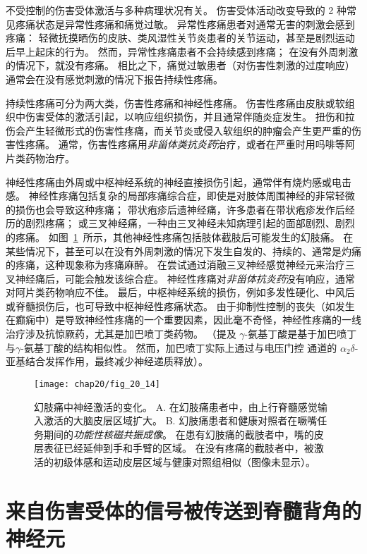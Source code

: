 不受控制的伤害受体激活与多种病理状况有关。
伤害受体活动改变导致的 2 种常见疼痛状态是异常性疼痛和痛觉过敏。
异常性疼痛患者对通常无害的刺激会感到疼痛：
轻微抚摸晒伤的皮肤、类风湿性关节炎患者的关节运动，甚至是剧烈运动后早上起床的行为。
然而，异常性疼痛患者不会持续感到疼痛；
在没有外周刺激的情况下，就没有疼痛。
相比之下，痛觉过敏患者（对伤害性刺激的过度响应）通常会在没有感觉刺激的情况下报告持续性疼痛。


持续性疼痛可分为两大类，伤害性疼痛和神经性疼痛。
伤害性疼痛由皮肤或软组织中伤害受体的激活引起，以响应组织损伤，并且通常伴随炎症发生。
扭伤和拉伤会产生轻微形式的伤害性疼痛，而关节炎或侵入软组织的肿瘤会产生更严重的伤害性疼痛。
通常，伤害性疼痛用\textit{非甾体类抗炎药}治疗，或者在严重时用吗啡等阿片类药物治疗。


神经性疼痛由外周或中枢神经系统的神经直接损伤引起，通常伴有烧灼感或电击感。
神经性疼痛包括复杂的局部疼痛综合症，即使是对肢体周围神经的非常轻微的损伤也会导致这种疼痛；
带状疱疹后遗神经痛，许多患者在带状疱疹发作后经历的剧烈疼痛；
或三叉神经痛，一种由三叉神经未知病理引起的面部剧烈、剧烈的疼痛。
如图~\ref{fig:20_14}~所示，其他神经性疼痛包括肢体截肢后可能发生的幻肢痛。
在某些情况下，甚至可以在没有外周刺激的情况下发生自发的、持续的、通常是灼痛的疼痛，这种现象称为疼痛麻醉。
在尝试通过消融三叉神经感觉神经元来治疗三叉神经痛后，可能会触发该综合症。
神经性疼痛对\textit{非甾体抗炎药}没有响应，通常对阿片类药物响应不佳。
最后，中枢神经系统的损伤，例如多发性硬化、中风后或脊髓损伤后，也可导致中枢神经性疼痛状态。
由于抑制性控制的丧失（如发生在癫痫中）是导致神经性疼痛的一个重要因素，因此毫不奇怪，神经性疼痛的一线治疗涉及抗惊厥药，尤其是加巴喷丁类药物。
（提及 $\gamma$-氨基丁酸是基于加巴喷丁与$\gamma$-氨基丁酸的结构相似性。
然而，加巴喷丁实际上通过与电压门控  通道的 $ \alpha_2\delta $-亚基结合发挥作用，最终减少神经递质释放）。


\begin{figure}[htbp]
	\centering
	\texttt{[image: chap20/fig\_20\_14]}
	\caption{幻肢痛中神经激活的变化。
		A. 在幻肢痛患者中，由上行脊髓感觉输入激活的大脑皮层区域扩大。
		B. 幻肢痛患者和健康对照者在噘嘴任务期间的\textit{功能性核磁共振成像}。
		在患有幻肢痛的截肢者中，嘴的皮层表征已经延伸到手和手臂的区域。
		在没有疼痛的截肢者中，被激活的初级体感和运动皮层区域与健康对照组相似（图像未显示）\cite{flor2006phantom}。}
	\label{fig:20_14}
\end{figure}



\section{来自伤害受体的信号被传送到脊髓背角的神经元}

